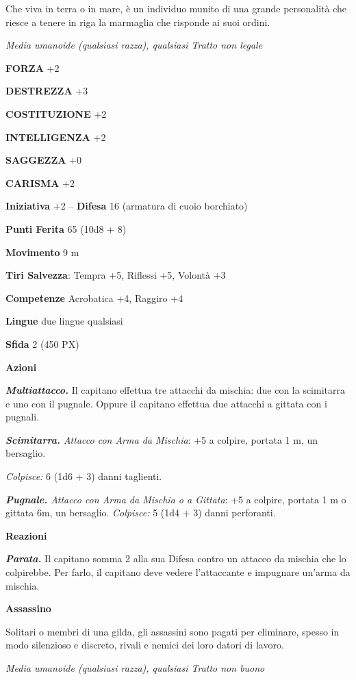 \begin{multicols}{2}
	Che viva in terra o in mare, è un individuo munito di una grande personalità che riesce a tenere in riga la marmaglia che risponde ai suoi ordini.

	\textit{Media umanoide (qualsiasi razza), qualsiasi Tratto non legale}

	\textbf{FORZA} +2

	\textbf{DESTREZZA} +3

	\textbf{COSTITUZIONE} +2

	\textbf{INTELLIGENZA} +2

	\textbf{SAGGEZZA} +0

	\textbf{CARISMA} +2

	\textbf{Iniziativa} +2 -- \textbf{Difesa} 16 (armatura di cuoio borchiato)

	\textbf{Punti Ferita} 65 (10d8 + 8)

	\textbf{Movimento} 9 m

	\textbf{Tiri Salvezza}: Tempra +5, Riflessi +5, Volontà +3

	\textbf{Competenze} Acrobatica +4, Raggiro +4

	\textbf{Lingue} due lingue qualsiasi

	\textbf{Sfida} 2 (450 PX)

	\textbf{Azioni}

	\textit{\textbf{Multiattacco.}} Il capitano effettua tre attacchi da mischia: due con la scimitarra e uno con il pugnale. Oppure il capitano effettua due attacchi a gittata con i pugnali.

	\textit{\textbf{Scimitarra.} Attacco con Arma da Mischia}: +5 a colpire, portata 1 m, un bersaglio.

	\textit{Colpisce:} 6 (1d6 + 3) danni taglienti.

	\textit{\textbf{Pugnale.} Attacco con Arma da Mischia o a Gittata}: +5 a colpire, portata 1 m o gittata 6m, un bersaglio. \textit{Colpisce:} 5 (1d4 + 3) danni perforanti.

	\textbf{Reazioni}

	\textit{\textbf{Parata.}} Il capitano somma 2 alla sua Difesa contro un attacco da mischia che lo colpirebbe. Per farlo, il capitano deve vedere l'attaccante e impugnare un'arma da mischia.

	\medskip\textbf{Assassino}

	Solitari o membri di una gilda, gli assassini sono pagati per eliminare, spesso in modo silenzioso e discreto, rivali e nemici dei loro datori di lavoro.

	\textit{Media umanoide (qualsiasi razza), qualsiasi Tratto non buono}


\end{multicols}
